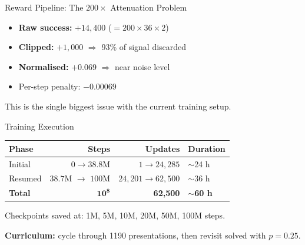 \documentclass[aspectratio=169,11pt]{beamer}
\begin{document}
\begin{frame}{Reward Pipeline: The $200\times$ Attenuation Problem}
  \begin{center}
  \end{center}

  \bigskip
  \begin{itemize}
    \item \textbf{Raw success:} $+14{,}400$ ($= 200 \times 36 \times 2$)
    \item \textbf{Clipped:} $+1{,}000$ \quad $\Rightarrow$ \textcolor{bad}{93\% of signal discarded}
    \item \textbf{Normalised:} $+0.069$ \quad $\Rightarrow$ \textcolor{bad}{near noise level}
    \item Per-step penalty: $-0.00069$
  \end{itemize}

  \bigskip
  \alert{This is the single biggest issue} with the current training setup.
\end{frame}

\begin{frame}{Training Execution}
  \begin{center}
  \begin{tabular}{lrrl}
    \toprule
    \textbf{Phase} & \textbf{Steps} & \textbf{Updates} & \textbf{Duration} \\
    \midrule
    Initial & $0 \to 38.8$M & $1 \to 24{,}285$ & $\sim$24 h \\
    Resumed & $38.7$M $\to$ $100$M & $24{,}201 \to 62{,}500$ & $\sim$36 h \\
    \midrule
    \textbf{Total} & $\mathbf{10^8}$ & \textbf{62{,}500} & $\sim$\textbf{60 h} \\
    \bottomrule
  \end{tabular}
  \end{center}

  \bigskip
  Checkpoints saved at: 1M, 5M, 10M, 20M, 50M, 100M steps.

  \bigskip
  \textbf{Curriculum:} cycle through 1190 presentations, then revisit solved with $p = 0.25$.
\end{frame}
\end{document}
